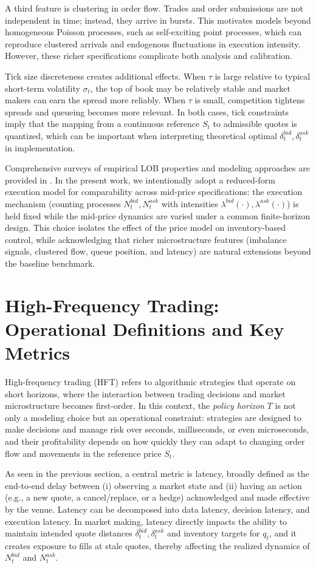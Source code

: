 \documentclass[a4paper,10pt,titlepage,oneside,openany]{book}
\newcommand{\textcite}[1]{\cite{#1}}
\theoremstyle{plain}\newtheorem{theorem}{Theorem}[chapter]
\theoremstyle{definition}\newtheorem{definition}{Definition}[chapter]
\theoremstyle{remark}\newtheorem{remark}{Remark}[chapter]
\begin{document}
A third feature is clustering in order flow. Trades and order submissions are not independent in time; instead, they arrive in bursts. This motivates models beyond homogeneous Poisson processes, such as self-exciting point processes, which can reproduce clustered arrivals and endogenous fluctuations in execution intensity. However, these richer specifications complicate both analysis and calibration.

Tick size discreteness creates additional effects. When $\tau$ is large relative to typical short-term volatility $\sigma_t$, the top of book may be relatively stable and market makers can earn the spread more reliably. When $\tau$ is small, competition tightens spreads and queueing becomes more relevant. In both cases, tick constraints imply that the mapping from a continuous reference $S_t$ to admissible quotes is quantized, which can be important when interpreting theoretical optimal $\delta_t^{bid},\delta_t^{ask}$ in implementation.

Comprehensive surveys of empirical LOB properties and modeling approaches are provided in \textcite{GouldEtAl2013}. In the present work, we intentionally adopt a reduced-form execution model for comparability across mid-price specifications: the execution mechanism (counting processes $N_t^{bid},N_t^{ask}$ with intensities $\lambda^{bid}(\cdot),\lambda^{ask}(\cdot)$) is held fixed while the mid-price dynamics are varied under a common finite-horizon design. This choice isolates the effect of the price model on inventory-based control, while acknowledging that richer microstructure features (imbalance signals, clustered flow, queue position, and latency) are natural extensions beyond the baseline benchmark.

\section{High-Frequency Trading: Operational Definitions and Key Metrics}
High-frequency trading (HFT) refers to algorithmic strategies that operate on short horizons, where the interaction between trading decisions and market microstructure becomes first-order. In this context, the \emph{policy horizon} $T$ is not only a modeling choice but an operational constraint: strategies are designed to make decisions and manage risk over seconds, milliseconds, or even microseconds, and their profitability depends on how quickly they can adapt to changing order flow and movements in the reference price $S_t$.

As seen in the previous section, a central metric is latency, broadly defined as the end-to-end delay between (i) observing a market state and (ii) having an action (e.g., a new quote, a cancel/replace, or a hedge) acknowledged and made effective by the venue. Latency can be decomposed into data latency, decision latency, and execution latency. In market making, latency directly impacts the ability to maintain intended quote distances $\delta_t^{bid},\delta_t^{ask}$ and inventory targets for $q_t$, and it creates exposure to fills at stale quotes, thereby affecting the realized dynamics of $N_t^{bid}$ and $N_t^{ask}$.
\end{document}
